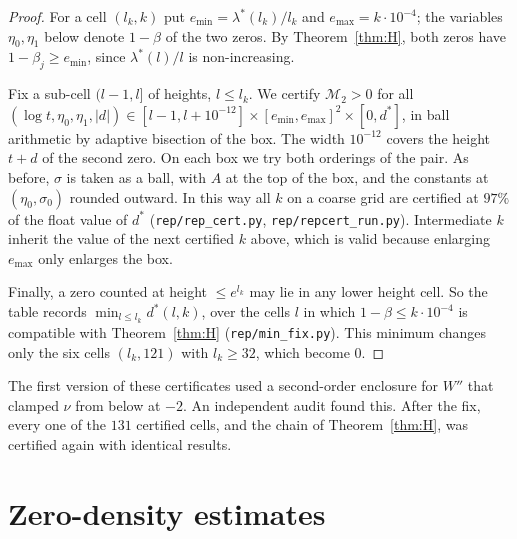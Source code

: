 \documentclass[11pt]{amsart}
\numberwithin{equation}{section}
\theoremstyle{definition}
\theoremstyle{remark}
\newcommand{\code}[1]{\texttt{#1}}
\begin{document}
\begin{proof}
For a cell $(l_k,k)$ put $e_{\min} = \lambda^*(l_k)/l_k$ and $e_{\max} = k\cdot10^{-4}$; the variables $\eta_0,\eta_1$ below denote $1-\beta$ of the two zeros.
By Theorem~\ref{thm:H}, both zeros have $1-\beta_j \ge e_{\min}$, since $\lambda^*(l)/l$ is non-increasing.

Fix a sub-cell $(l-1, l]$ of heights, $l \le l_k$.
We certify $\mathcal M_2 > 0$ for all $(\log t, \eta_0, \eta_1, |d|) \in [l-1, l + 10^{-12}] \times [e_{\min},e_{\max}]^2 \times [0, d^*]$, in ball arithmetic by adaptive bisection of the box.
The width $10^{-12}$ covers the height $t+d$ of the second zero.
On each box we try both orderings of the pair.
As before, $\sigma$ is taken as a ball, with $A$ at the top of the box, and the constants at $(\eta_0,\sigma_0)$ rounded outward.
In this way all $k$ on a coarse grid are certified at $97\%$ of the float value of $d^*$ (\code{rep/rep\_cert.py}, \code{rep/repcert\_run.py}).
Intermediate $k$ inherit the value of the next certified $k$ above, which is valid because enlarging $e_{\max}$ only enlarges the box.

Finally, a zero counted at height $\le e^{l_k}$ may lie in any lower height cell.
So the table records $\min_{l\le l_k} d^*(l,k)$, over the cells $l$ in which $1-\beta \le k\cdot10^{-4}$ is compatible with Theorem~\ref{thm:H} (\code{rep/min\_fix.py}).
This minimum changes only the six cells $(l_k, 121)$ with $l_k \ge 32$, which become $0$.
\end{proof}

The first version of these certificates used a second-order enclosure for $W''$ that clamped $\nu$ from below at $-2$.
An independent audit found this.
After the fix, every one of the $131$ certified cells, and the chain of Theorem~\ref{thm:H}, was certified again with identical results.
\section{Zero-density estimates}\label{sec:density}
\end{document}
